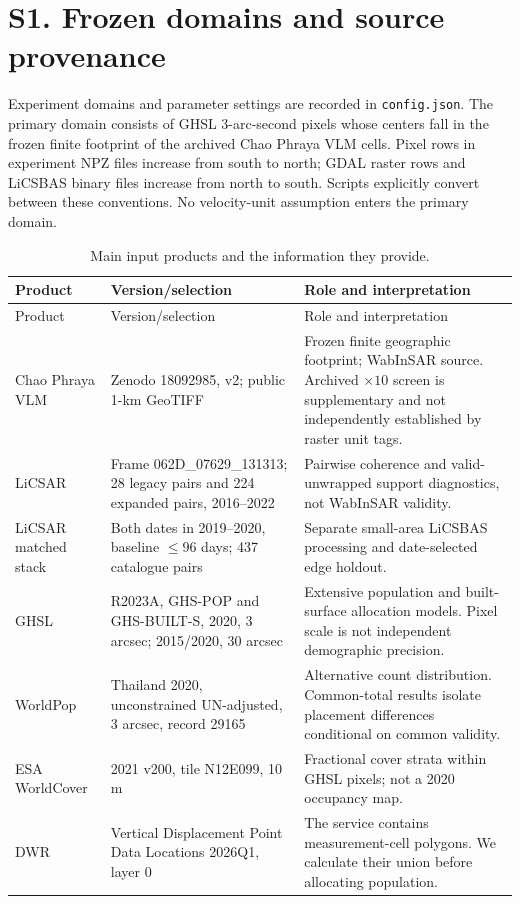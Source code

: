 \documentclass[10pt,a4paper]{article}
\begin{document}
\section*{S1. Frozen domains and source provenance}
Experiment domains and parameter settings are recorded in \texttt{config.json}. The primary domain consists of GHSL 3-arc-second pixels whose centers fall in the frozen finite footprint of the archived Chao Phraya VLM cells. Pixel rows in experiment NPZ files increase from south to north; GDAL raster rows and LiCSBAS binary files increase from north to south. Scripts explicitly convert between these conventions. No velocity-unit assumption enters the primary domain.

\begin{longtable}{p{.23\linewidth}p{.31\linewidth}p{.38\linewidth}}
\caption{Main input products and the information they provide.}\\
\toprule Product & Version/selection & Role and interpretation\\\midrule\endfirsthead
\toprule Product & Version/selection & Role and interpretation\\\midrule\endhead
Chao Phraya VLM & Zenodo 18092985, v2; public 1-km GeoTIFF & Frozen finite geographic footprint; WabInSAR source. Archived $\times10$ screen is supplementary and not independently established by raster unit tags.\\
LiCSAR & Frame 062D\_07629\_131313; 28 legacy pairs and 224 expanded pairs, 2016--2022 & Pairwise coherence and valid-unwrapped support diagnostics, not WabInSAR validity.\\
LiCSAR matched stack & Both dates in 2019--2020, baseline $\leq96$ days; 437 catalogue pairs & Separate small-area LiCSBAS processing and date-selected edge holdout.\\
GHSL & R2023A, GHS-POP and GHS-BUILT-S, 2020, 3 arcsec; 2015/2020, 30 arcsec & Extensive population and built-surface allocation models. Pixel scale is not independent demographic precision.\\
WorldPop & Thailand 2020, unconstrained UN-adjusted, 3 arcsec, record 29165 & Alternative count distribution. Common-total results isolate placement differences conditional on common validity.\\
ESA WorldCover & 2021 v200, tile N12E099, 10 m & Fractional cover strata within GHSL pixels; not a 2020 occupancy map.\\
DWR & Vertical Displacement Point Data Locations 2026Q1, layer 0 & The service contains measurement-cell polygons. We calculate their union before allocating population.\\\bottomrule
\end{longtable}
\end{document}
